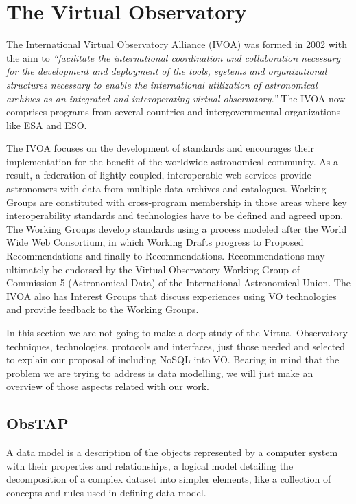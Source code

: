 \chapter{The Virtual Observatory} \label{vochapter}

The International Virtual Observatory Alliance
(IVOA) was formed in 2002 with the aim to
\emph{``facilitate the international coordination and collaboration necessary for the development and deployment of the tools, systems and organizational structures necessary to enable the international utilization of astronomical archives as an integrated and interoperating virtual observatory.''}
The IVOA now comprises programs from several countries and intergovernmental organizations like ESA and ESO. 

The IVOA focuses on the development of standards and encourages their implementation for the benefit of the worldwide astronomical community.
As a result, a federation of lightly-coupled, interoperable web-services provide astronomers with data from multiple data archives and catalogues.
Working Groups are constituted with cross-program membership in those areas where key interoperability standards and technologies have to be defined and agreed upon. The Working Groups develop standards using a process modeled after the World Wide Web Consortium, in which Working Drafts progress to Proposed Recommendations and finally to Recommendations. Recommendations may ultimately be endorsed by the Virtual Observatory Working Group of Commission 5 (Astronomical Data) of the International Astronomical Union. The IVOA also has Interest Groups that discuss experiences using VO technologies and provide feedback to the Working Groups. 

In this section we are not going to make a deep study of the Virtual Observatory techniques, technologies, protocols and interfaces, just those needed and selected to explain our proposal of including NoSQL into VO. Bearing in mind that the problem we are trying to address is data modelling, we will just make an overview of those aspects related with our work.

\section{ObsTAP}

A data model is a description of the objects represented by a computer system with their properties and relationships, a logical model detailing the decomposition of a complex dataset into simpler elements, like a collection of concepts and rules used in defining data model. 

